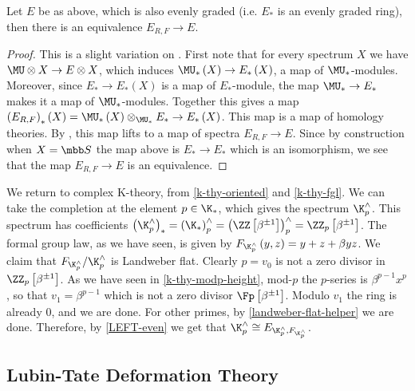 \begin{theorem}\label{LEFT-even}
	Let $E$ be as above, which is also evenly graded (i.e. $E_*$ is an evenly graded ring), then there is an equivalence $E_{R,F} \to E$.
\end{theorem}

\begin{proof}
	This is a slight variation on \cite[18, proposition 11]{Lur}.
	First note that for every spectrum $X$ we have $\MU \otimes X \to E \otimes X$, which induces $\MU_*\left(X\right) \to E_*\left(X\right)$, a map of $\MU_*$-modules.
	Moreover, since $E_* \to E_*\left(X\right)$ is a map of $E_*$-module, the map $\MU_* \to E_*$ makes it a map of $\MU_*$-modules.
	Together this gives a map $\left(E_{R,F}\right)_*\left(X\right) = \MU_*\left(X\right) \otimes_{\MU_*} E_* \to E_*\left(X\right)$.
	This map is a map of homology theories. 
	By \cite[17, theorem 6]{Lur} , this map lifts to a map of spectra $E_{R,F} \to E$.
	Since by construction when $X = \SS$ the map above is $E_* \to E_*$ which is an isomorphism, we see that the map $E_{R,F} \to E$ is an equivalence.
\end{proof}

\begin{example}\label{k-thy-comp-left}
	We return to complex K-theory, from \ref{k-thy-oriented} and \ref{k-thy-fgl}.
	We can take the completion at the element $p \in \K_*$, which gives the spectrum $\K_p^\wedge$.
	This spectrum has coefficients
	$
	\left(\K_p^\wedge\right)_*
	= \left(\K_*\right)_p^\wedge
	= \left(\ZZ\left[\beta^{\pm 1}\right]\right)_p^\wedge
	= \ZZ_p\left[\beta^{\pm 1}\right]
	$.
	The formal group law, as we have seen, is given by $F_{\K_p^\wedge}\left(y,z\right) = y + z + \beta y z$.
	We claim that $F_{\K_p^\wedge}/\K_p^\wedge$ is Landweber flat.
	Clearly $p = v_0$ is not a zero divisor in $\ZZ_p\left[\beta^{\pm 1}\right]$.
	As we have seen in \ref{k-thy-modp-height}, mod-$p$ the $p$-series is $\beta^{p-1} x^p$, so that $v_1 = \beta^{p-1}$ which is not a zero divisor $\Fp\left[\beta^{\pm 1}\right]$.
	Modulo $v_1$ the ring is already $0$, and we are done.
	For other primes, by \ref{landweber-flat-helper} we are done.
	Therefore, by \ref{LEFT-even} we get that $\K_p^\wedge \cong E_{\K_p^\wedge, F_{\K_p^\wedge}}$.
\end{example}



\subsection{Lubin-Tate Deformation Theory}

